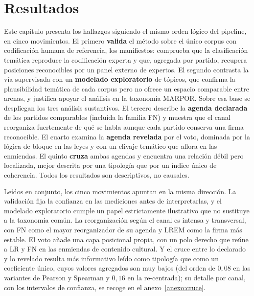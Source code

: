 \chapter{Resultados}
\label{cap:resultados}


Este capítulo presenta los hallazgos siguiendo el mismo orden lógico del
pipeline, en cinco movimientos. El primero \textbf{valida} el método sobre el
único corpus con codificación humana de referencia, los manifiestos: comprueba
que la clasificación temática reproduce la codificación experta y que, agregada
por partido, recupera posiciones reconocibles por un panel externo de expertos.
El segundo contrasta la vía supervisada con un \textbf{modelado exploratorio} de
tópicos, que confirma la plausibilidad temática de cada corpus pero no ofrece un
espacio comparable entre arenas, y justifica apoyar el análisis en la taxonomía
MARPOR. Sobre esa base se despliegan los tres análisis sustantivos. El tercero
describe la \textbf{agenda declarada} de los partidos comparables (incluida la
familia FN) y muestra que el canal reorganiza fuertemente de qué se habla
aunque cada partido conserva una firma reconocible. El cuarto examina la
\textbf{agenda revelada} por el voto, dominada por la lógica de bloque en las
leyes y con un clivaje temático que aflora en las enmiendas. El quinto
\textbf{cruza} ambas agendas y encuentra una relación débil pero localizada,
mejor descrita por una tipología que por un índice único de coherencia. Todos los
resultados son descriptivos, no causales.

Leídos en conjunto, los cinco movimientos apuntan en la misma dirección. La
validación fija la confianza en las mediciones antes de interpretarlas, y el
modelado exploratorio cumple un papel estrictamente ilustrativo que no sustituye
a la taxonomía común. La reorganización según el canal es intensa y transversal,
con FN como el mayor reorganizador de su agenda y LREM como la firma más estable.
El voto añade una capa posicional propia, con un polo derecho que reúne a LR y
FN en las enmiendas de contenido cultural. Y el cruce entre lo declarado y lo
revelado resulta más informativo leído como tipología que como un coeficiente
único, cuyos valores agregados son muy bajos (del orden de $0{,}08$ en las
variantes de Pearson y Spearman y $0{,}16$ en la re-centrada); su detalle por
canal, con los intervalos de confianza, se recoge en el
anexo~\ref{anexo:cruce}.


